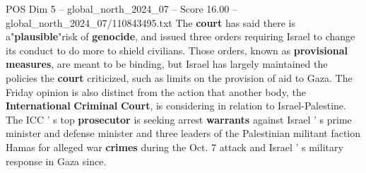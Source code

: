 \begin{textsample}{POS Dim 5 – global\_north\_2024\_07 – Score 16.00 – global\_north\_2024\_07/110843495.txt}
The \textbf{court} has said there is a"\textbf{plausible}"risk of \textbf{genocide}, and issued three orders requiring Israel to change its conduct to do more to shield civilians.
Those orders, known as \textbf{provisional} \textbf{measures}, are meant to be binding, but Israel has largely maintained the policies the \textbf{court} criticized, such as limits on the provision of aid to Gaza.
The Friday opinion is also distinct from the action that another body, the \textbf{International} \textbf{Criminal} \textbf{Court}, is considering in relation to Israel-Palestine.
The ICC ' s top \textbf{prosecutor} is seeking arrest \textbf{warrants} against Israel ' s prime minister and defense minister and three leaders of the Palestinian militant faction Hamas for alleged war \textbf{crimes} during the Oct. 7 attack and Israel ' s military response in Gaza since.

\end{textsample}
